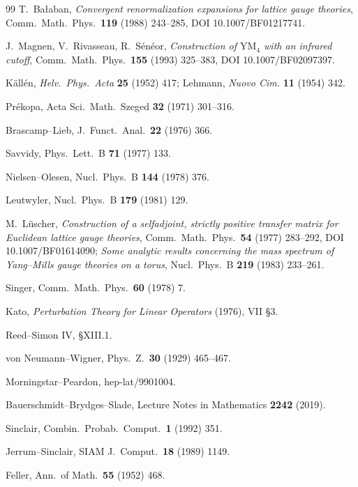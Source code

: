 {\begin{thebibliography}{99}
 T.~Ba{\l}aban, \emph{Convergent renormalization expansions for
  lattice gauge theories}, Comm.\ Math.\ Phys.\ \textbf{119} (1988) 243--285,
  DOI 10.1007/BF01217741.

 J.~Magnen, V.~Rivasseau, R.~S\'en\'eor, \emph{Construction of $\mathrm{YM}_4$
  with an infrared cutoff}, Comm.\ Math.\ Phys.\ \textbf{155} (1993) 325--383,
  DOI 10.1007/BF02097397.

 K\"all\'en, \emph{Helv.\ Phys.\ Acta} \textbf{25} (1952) 417; Lehmann,
  \emph{Nuovo Cim.} \textbf{11} (1954) 342.

 Pr\'ekopa, Acta Sci.\ Math.\ Szeged \textbf{32} (1971) 301--316.

 Brascamp--Lieb, J.\ Funct.\ Anal.\ \textbf{22} (1976) 366.

 Savvidy, Phys.\ Lett.\ B \textbf{71} (1977) 133.

 Nielsen--Olesen, Nucl.\ Phys.\ B \textbf{144} (1978) 376.

 Leutwyler, Nucl.\ Phys.\ B \textbf{179} (1981) 129.

 M.~L\"uscher, \emph{Construction of a selfadjoint, strictly positive
  transfer matrix for Euclidean lattice gauge theories}, Comm.\ Math.\ Phys.\ \textbf{54}
  (1977) 283--292, DOI 10.1007/BF01614090; \emph{Some analytic results concerning the mass
  spectrum of Yang--Mills gauge theories on a torus}, Nucl.\ Phys.\ B \textbf{219} (1983)
  233--261.

 Singer, Comm.\ Math.\ Phys.\ \textbf{60} (1978) 7.

 Kato, \emph{Perturbation Theory for Linear Operators} (1976), VII \S3.

 Reed--Simon IV, \S XIII.1.

 von Neumann--Wigner, Phys.\ Z.\ \textbf{30} (1929) 465--467.

 Morningstar--Peardon, hep-lat/9901004.

 Bauerschmidt--Brydges--Slade, Lecture Notes in Mathematics \textbf{2242} (2019).

 Sinclair, Combin.\ Probab.\ Comput.\ \textbf{1} (1992) 351.

 Jerrum--Sinclair, SIAM J.\ Comput.\ \textbf{18} (1989) 1149.

 Feller, Ann.\ of Math.\ \textbf{55} (1952) 468.


\end{thebibliography}}
